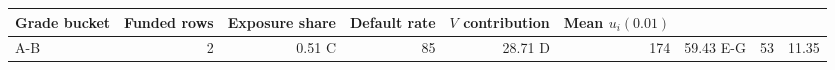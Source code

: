 \begin{tabular}{lrrrrr}
\toprule
Grade bucket & Funded rows & Exposure share & Default rate & $V$ contribution & Mean $u_i(0.01)$ \\
\midrule
A-B & 2 & 0.51%
C & 85 & 28.71%
D & 174 & 59.43%
E-G & 53 & 11.35%
\bottomrule
\end{tabular}
